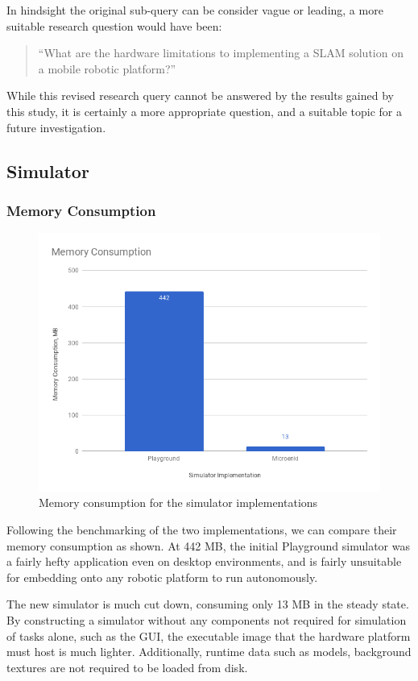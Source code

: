 In hindsight the original sub-query can be consider vague or leading, a more
suitable research question would have been:

\begin{quote}
``What are the hardware limitations to implementing a SLAM solution on a
mobile robotic platform?''
\end{quote}

While this revised research query cannot be answered by the results gained by
this study, it is certainly a more appropriate question, and a suitable topic
for a future investigation.


\subsection{Simulator}
\subsubsection{Memory Consumption}
\begin{figure}[!h]
    \centering
    \includegraphics[width=\textwidth]{memory.png}
    \caption{Memory consumption for the simulator implementations}
\end{figure}
Following the benchmarking of the two implementations, we can compare their
memory consumption as shown. At 442 MB, the initial Playground simulator was a
fairly hefty application even on desktop environments, and is fairly unsuitable
for embedding onto any robotic platform to run autonomously.

The new simulator is much cut down, consuming only 13 MB in the steady state.
By constructing a simulator without any components not required for simulation
of tasks alone, such as the GUI, the executable image that the hardware
platform must host is much lighter. Additionally, runtime data such as models,
background textures are not required to be loaded from disk.

